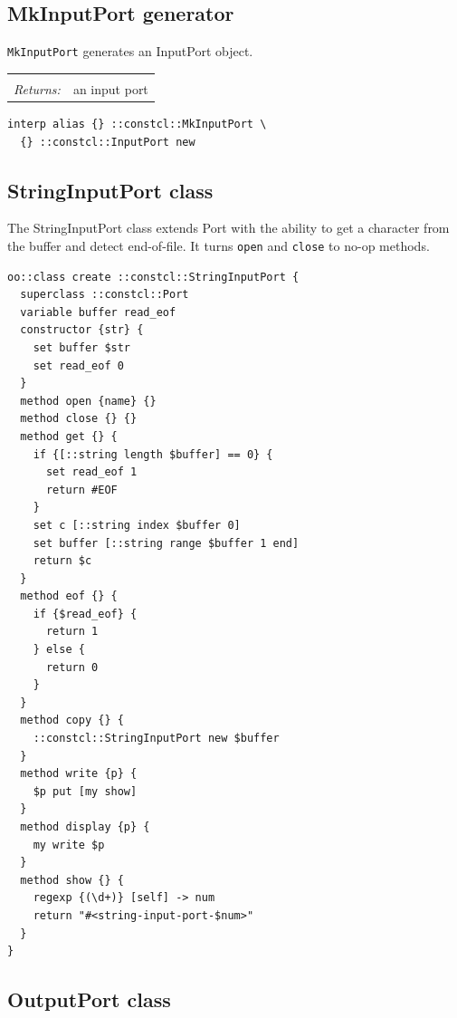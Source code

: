 \documentclass[twoside]{report}
\begin{document}
\subsection{MkInputPort generator}
\label{mkinputport-generator}

\texttt{MkInputPort} generates an InputPort object.

\noindent\begin{tabular}{ |p{1.9cm} p{8cm}| }
\hline
\rowcolor[HTML]{CCCCCC} \multicolumn{2}{|l|}{\bf MkInputPort (internal)} \\
\textit{Returns:} & an input port \\
\hline
\end{tabular}

\begin{lstlisting}
interp alias {} ::constcl::MkInputPort \
  {} ::constcl::InputPort new
\end{lstlisting}

\subsection{StringInputPort class}
\label{stringinputport-class}

The StringInputPort class extends Port with the ability to get a character from the buffer and detect end-of-file. It turns \texttt{open} and \texttt{close} to no-op methods.

\begin{lstlisting}
oo::class create ::constcl::StringInputPort {
  superclass ::constcl::Port
  variable buffer read_eof
  constructor {str} {
    set buffer $str
    set read_eof 0
  }
  method open {name} {}
  method close {} {}
  method get {} {
    if {[::string length $buffer] == 0} {
      set read_eof 1
      return #EOF
    }
    set c [::string index $buffer 0]
    set buffer [::string range $buffer 1 end]
    return $c
  }
  method eof {} {
    if {$read_eof} {
      return 1
    } else {
      return 0
    }
  }
  method copy {} {
    ::constcl::StringInputPort new $buffer
  }
  method write {p} {
    $p put [my show]
  }
  method display {p} {
    my write $p
  }
  method show {} {
    regexp {(\d+)} [self] -> num
    return "#<string-input-port-$num>"
  }
}
\end{lstlisting}

\subsection{OutputPort class}
\label{outputport-class}
\end{document}
